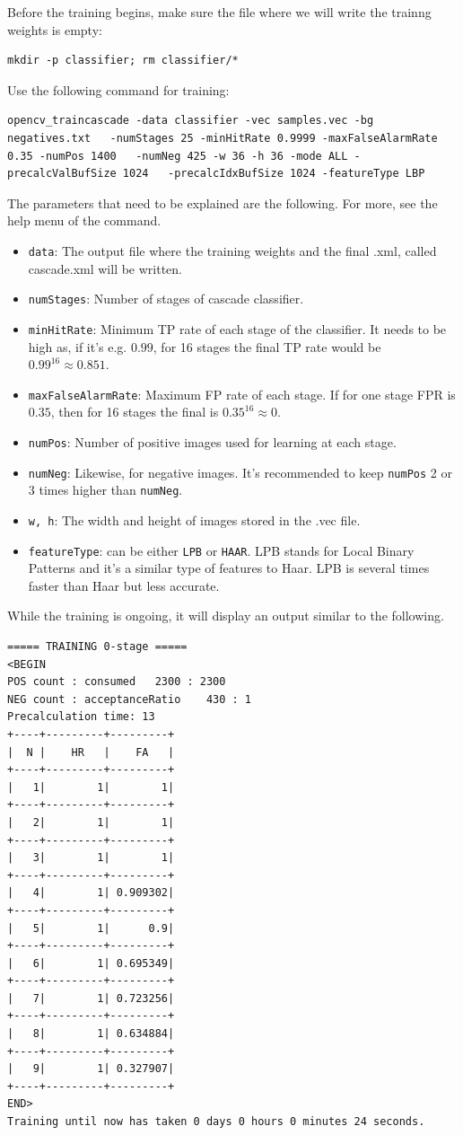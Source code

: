 \documentclass[a4paper]{article}
\begin{document}
Before the training begins, make sure the file where we will write the trainng weights is empty:
\begin{verbatim}
mkdir -p classifier; rm classifier/*
\end{verbatim}
Use the following command for training:
\begin{verbatim}
opencv_traincascade -data classifier -vec samples.vec -bg negatives.txt   -numStages 25 -minHitRate 0.9999 -maxFalseAlarmRate 0.35 -numPos 1400   -numNeg 425 -w 36 -h 36 -mode ALL -precalcValBufSize 1024   -precalcIdxBufSize 1024 -featureType LBP
\end{verbatim}
The parameters that need to be explained are the following. For more, see the help menu of the command.
\begin{itemize}
    \item \texttt{data}: The output file where the training weights and the final .xml, called cascade.xml will be written.
    \item \texttt{numStages}: Number of stages of cascade classifier.
    \item \texttt{minHitRate}: Minimum TP rate of each stage of the classifier. It needs to be high as, if it's e.g. $0.99$, for 16 stages the final TP rate would be $0.99^{16} \approx 0.851$. 
    \item \texttt{maxFalseAlarmRate}: Maximum FP rate of each stage. If for one stage FPR is $0.35$, then for 16 stages the final is $0.35^{16} \approx 0$.
    \item \texttt{numPos}: Number of positive images used for learning at each stage.
    \item \texttt{numNeg}: Likewise, for negative images. It's recommended to keep \texttt{numPos} 2 or 3 times higher than \texttt{numNeg}.
    \item \texttt{w, h}: The width and height of images stored in the .vec file.
    \item \texttt{featureType}: can be either \texttt{LPB} or \texttt{HAAR}. LPB stands for Local Binary Patterns and it's a similar type of  features to Haar. LPB is several times faster than Haar but less accurate.
\end{itemize}
While the training is ongoing, it will display an output similar to the following.
\begin{verbatim}
===== TRAINING 0-stage =====
<BEGIN
POS count : consumed   2300 : 2300
NEG count : acceptanceRatio    430 : 1
Precalculation time: 13
+----+---------+---------+
|  N |    HR   |    FA   |
+----+---------+---------+
|   1|        1|        1|
+----+---------+---------+
|   2|        1|        1|
+----+---------+---------+
|   3|        1|        1|
+----+---------+---------+
|   4|        1| 0.909302|
+----+---------+---------+
|   5|        1|      0.9|
+----+---------+---------+
|   6|        1| 0.695349|
+----+---------+---------+
|   7|        1| 0.723256|
+----+---------+---------+
|   8|        1| 0.634884|
+----+---------+---------+
|   9|        1| 0.327907|
+----+---------+---------+
END>
Training until now has taken 0 days 0 hours 0 minutes 24 seconds.
\end{verbatim}
\end{document}
